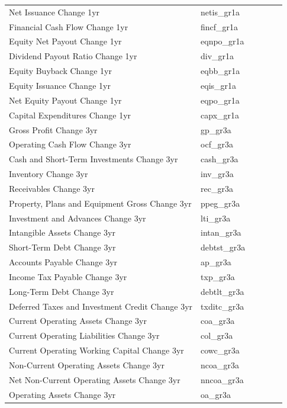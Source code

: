 \documentclass[12pt,title,fleqn]{article}
\begin{document}
\begin{longtable}{p{5cm}p{2cm}p{5cm}lll}
Net Issuance Change 1yr & netis\_gr1a & & & & \\
Financial Cash Flow Change 1yr & fincf\_gr1a & & & & \\
Equity Net Payout Change 1yr & eqnpo\_gr1a & & & & \\
Dividend Payout Ratio Change 1yr & div\_gr1a & & & & \\
Equity Buyback Change 1yr & eqbb\_gr1a & & & & \\
Equity Issuance Change 1yr & eqis\_gr1a & & & & \\
Net Equity Payout Change 1yr & eqpo\_gr1a & & & & \\
Capital Expenditures Change 1yr & capx\_gr1a & & & & \\
Gross Profit Change 3yr & gp\_gr3a & & & & \\
Operating Cash Flow Change 3yr & ocf\_gr3a & & & & \\
Cash and Short-Term Investments Change 3yr & cash\_gr3a & & & & \\
Inventory Change 3yr & inv\_gr3a & & & & \\
Receivables Change 3yr & rec\_gr3a & & & & \\
Property, Plans and Equipment Gross Change 3yr & ppeg\_gr3a & & & & \\
Investment and Advances Change 3yr & lti\_gr3a & & & & \\
Intangible Assets Change 3yr & intan\_gr3a & & & & \\
Short-Term Debt Change 3yr & debtst\_gr3a & & & & \\
Accounts Payable Change 3yr & ap\_gr3a & & & & \\
Income Tax Payable Change 3yr & txp\_gr3a & & & & \\
Long-Term Debt Change 3yr & debtlt\_gr3a & & & & \\
Deferred Taxes and Investment Credit Change 3yr & txditc\_gr3a & & & & \\
Current Operating Assets Change 3yr & coa\_gr3a & & & & \\
Current Operating Liabilities Change 3yr & col\_gr3a & & & & \\
Current Operating Working Capital Change 3yr & cowc\_gr3a & & & & \\
Non-Current Operating Assets Change 3yr & ncoa\_gr3a & & & & \\
Net Non-Current Operating Assets Change 3yr & nncoa\_gr3a & & & & \\
Operating Assets Change 3yr & oa\_gr3a & & & & \\

\end{longtable}
\end{document}
